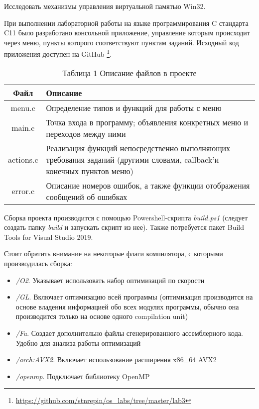 \documentclass[a4paper,14pt]{extarticle}
\newcommand{\Code}[1]{\textit{#1}}
\begin{document}


\renewcommand*{\thepage}{}
\tableofcontents
\clearpage
\renewcommand*{\thepage}{\arabic{page}}

\setcounter{page}{3}


Исследовать механизмы управления виртуальной памятью Win32.


При выполнении лабораторной работы на языке программирования C стандарта C11
было разработано консольной приложение, управление которым происходит через
меню, пункты которого соответствуют пунктам
заданий. Исходный код приложения доступен на GitHub
\footnote{\url{https://github.com/stnrepin/os_labs/tree/master/lab3}}.

\begin{table}[H]
    \centering
    \begin{tabularx}{\textwidth}{|c|X|}
        \hline
        Файл & Описание \\
        \hline
        menu.c & Определение типов и функций для работы с меню \\
        \hline
        main.c & Точка входа в программу; объявления конкретных меню и
                    переходов между ними \\
        \hline
        actions.c & Реализация функций непосредственно выполняющих требования
                    заданий (другими словами, callback'и конечных пунктов меню)
                    \\
        \hline
        error.c & Описание номеров ошибок, а также функции отображения
                    сообщений об ошибках \\
        \hline
    \end{tabularx}
    \caption*{Таблица 1 Описание файлов в проекте}
\end{table}

Сборка проекта производится с помощью Powershell-скрипта \Code{build.ps1}
(следует создать папку \Code{build} и запускать скрипт из нее). Также
потребуется пакет Build Tools for Visual Studio 2019.

Стоит обратить внимание на некоторые флаги компилятора, с которыми
производилась сборка:
\begin{itemize}
    \item \Code{/O2}. Указывает использовать набор оптимизаций по скорости
    \item \Code{/GL}. Включает оптимизацию всей программы (оптимизация
        производится на основе владения информацией обо всех модулях программы,
        обычно она производится только на основе одного compilation
        unit)
    \item \Code{/Fa}. Создает дополнительно файлы сгенерированного
        ассемблерного кода. Удобно для анализа работы оптимизаций
    \item \Code{/arch:AVX2}. Включает использование расширения x86\_64 AVX2
    \item \Code{/openmp}. Подключает библиотеку OpenMP
\end{itemize}
\end{document}
